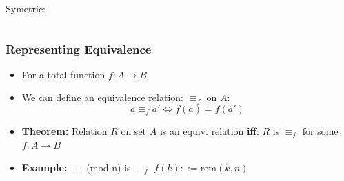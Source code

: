 \documentclass{beamer}
\begin{document}
\begin{frame}
{\begin{columns}
\begin{center}
      \bigskip

      Symetric:\\

      \end{center}
    \end{columns}
  }
\end{frame}

\begin{frame}
  \frametitle{Representing Equivalence}
  {\larger

    \begin{itemize}
    \item For a total function $f:A\rightarrow B$
    \item We can define an equivalence relation: $\equiv_f$ on $A$:
      \begin{equation}
        a \equiv_f a' \iff f(a) = f(a')
      \end{equation}

      \bigskip

    \item {\bf Theorem:} Relation $R$ on set $A$ is an equiv. relation
      {\bf iff}: $R$ is $\equiv_f$ for some $f:A\rightarrow B$

      \bigskip

    \item {\bf Example:} $\equiv$ (mod n) is $\equiv_f$
       $f(k) ::= \text{rem}(k,n)$
    \end{itemize}
  }
\end{frame}
\end{document}
